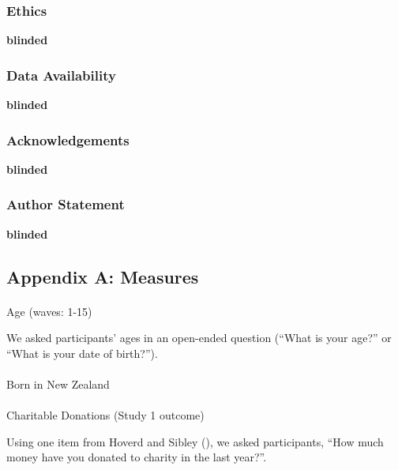 \documentclass[
  single column]{article}
\makeatletter
\let\oldparagraph\paragraph
\renewcommand{\paragraph}{
    \@ifstar
      \xxxParagraphStar
      \xxxParagraphNoStar
  }
\newcommand{\xxxParagraphStar}[1]{\oldparagraph*{#1}\mbox{}}
\newcommand{\xxxParagraphNoStar}[1]{\oldparagraph{#1}\mbox{}}
\makeatother
\begin{document}
\newpage{}

\subsubsection{Ethics}\label{ethics}

\textbf{blinded}

\subsubsection{Data Availability}\label{data-availability}

\textbf{blinded}

\subsubsection{Acknowledgements}\label{acknowledgements}

\textbf{blinded}

\subsubsection{Author Statement}\label{author-statement}

\textbf{blinded}

\newpage{}

\subsection{Appendix A: Measures}\label{appendix-measures}

\paragraph{Age (waves: 1-15)}\label{age-waves-1-15}

We asked participants' ages in an open-ended question (``What is your
age?'' or ``What is your date of birth?'').

\paragraph{Born in New Zealand}\label{born-in-new-zealand}

\paragraph{Charitable Donations (Study 1
outcome)}\label{charitable-donations-study-1-outcome}

Using one item from Hoverd and Sibley
(), we asked participants,
``How much money have you donated to charity in the last year?''.
\end{document}
